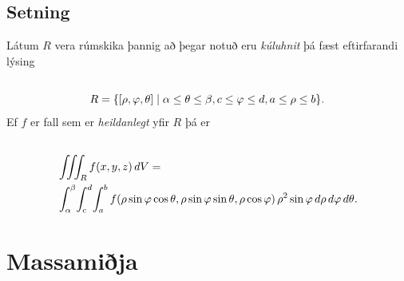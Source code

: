 \documentclass[a4paper,10pt,icelandic]{sphinxmanual}
\begin{document}
\subsection{Setning}
\label{Kafli4:id21}
Látum \(R\) vera rúmskika þannig að þegar notuð eru \textit{kúluhnit} þá fæst
eftirfarandi lýsing
\begin{gather}
\begin{split}\displaystyle\end{split}\notag\\\begin{split}R=\{[\rho,\varphi,\theta]\mid \alpha\leq\theta\leq\beta,
c\leq\varphi\leq d, a\leq \rho\leq b\}.\end{split}\notag
\end{gather}
Ef \(f\) er fall sem er \textit{heildanlegt} yfir \(R\) þá er
\begin{gather}
\begin{split}\displaystyle\end{split}\notag\\\begin{split}\begin{aligned}
&\int\!\!\!\int\!\!\!\int_R f(x,y,z)\,dV=\\ &\int_\alpha^\beta\!\int_c^d\!\int_a^b f(\rho\sin\varphi\cos\theta, \rho\sin\varphi\sin\theta,\rho\cos\varphi)
\,\rho^2\sin\varphi\,d\rho\,d\varphi\,d\theta.\end{aligned}\end{split}\notag
\end{gather}

\section{Massamiðja}
\label{Kafli4:index-16}\label{Kafli4:massamija}
\end{document}
